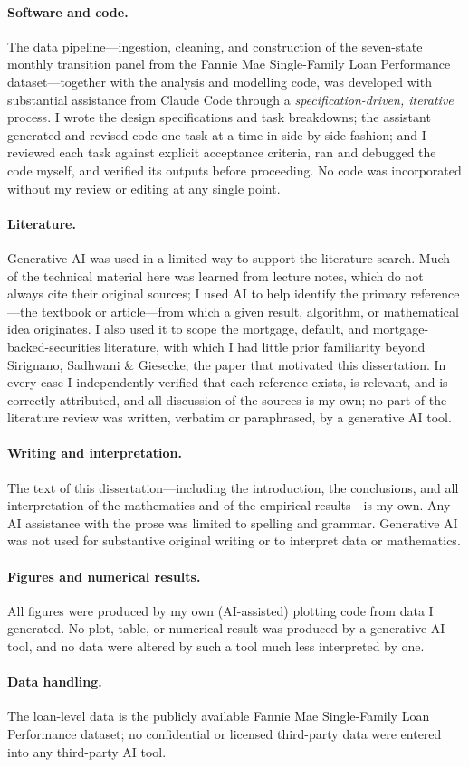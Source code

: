 \paragraph{Software and code.}
The data pipeline---ingestion, cleaning, and construction of the seven-state
monthly transition panel from the Fannie Mae Single-Family Loan Performance
dataset---together with the analysis and modelling code, was developed with
substantial assistance from Claude Code through a \emph{specification-driven,
iterative} process. I wrote the design specifications and task breakdowns; the
assistant generated and revised code one task at a time in side-by-side fashion; and I reviewed each
task against explicit acceptance criteria, ran and debugged the code myself, and
verified its outputs before proceeding. No code was incorporated without my
review or editing at any single point.

\paragraph{Literature.}
Generative AI was used in a limited way to support the literature search. Much of
the technical material here was learned from lecture notes, which do not always
cite their original sources; I used AI to help identify the primary
reference---the textbook or article---from which a given result, algorithm, or
mathematical idea originates. I also used it to scope the mortgage, default, and
mortgage-backed-securities literature, with which I had little prior familiarity
beyond Sirignano, Sadhwani \& Giesecke,%
{} the paper that motivated this dissertation. In every case I independently
verified that each reference exists, is relevant, and is correctly attributed,
and all discussion of the sources is my own; no part of the literature review was
written, verbatim or paraphrased, by a generative AI tool.

\paragraph{Writing and interpretation.}
The text of this dissertation---including the introduction, the conclusions, and
all interpretation of the mathematics and of the empirical results---is my own.
Any AI assistance with the prose was limited to spelling and grammar. Generative AI was not used for substantive
original writing or to interpret data or mathematics.

\paragraph{Figures and numerical results.}
All figures were produced by my own (AI-assisted) plotting code from data I
generated. No plot, table, or numerical result was produced by a generative AI
tool, and no data were altered by such a tool much less interpreted by one. 

\paragraph{Data handling.}
The loan-level data is the publicly available Fannie Mae
Single-Family Loan Performance dataset; no confidential or licensed third-party
data were entered into any third-party AI tool.
